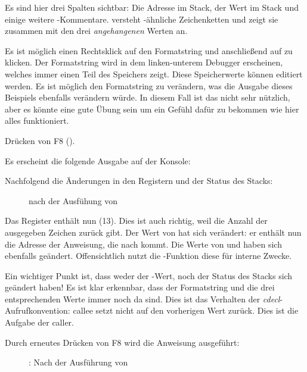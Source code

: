 Es sind hier drei Spalten sichtbar: Die Adresse im Stack, der Wert im Stack und einige weitere \olly-Kommentare.
\olly versteht \printf{}-ähnliche Zeichenketten und zeigt sie zusammen mit den drei \emph{angehangenen} Werten an.

Es ist möglich einen Rechtsklick auf den Formatstring und anschließend auf  zu klicken.
Der Formatstring wird in dem linken-unterem Debugger erscheinen, welches immer einen Teil des Speichers zeigt.
Diese Speicherwerte können editiert werden.
Es ist möglich den Formatstring zu verändern, was die Ausgabe dieses Beispiels ebenfalls verändern würde.
In diesem Fall ist das nicht sehr nützlich, aber es könnte eine gute Übung sein um ein Gefühl dafür zu
bekommen wie hier alles funktioniert.

\clearpage
Drücken von F8 (\stepover).

Es erscheint die folgende Ausgabe auf der Konsole:



Nachfolgend die Änderungen in den Registern und der Status des Stacks:

\begin{figure}[H]
\centering
{}
\caption{\olly nach der Ausfühung von \printf{}}
\label{fig:printf3_olly_3}
\end{figure}

Das Register \EAX enthält nun  (13).
Dies ist auch richtig, weil \printf die Anzahl der ausgegeben Zeichen zurück gibt.
Der Wert von \EIP hat sich verändert: er enthält nun die Adresse der Anweisung, die
nach  kommt.
Die Werte von \ECX und \EDX haben sich ebenfalls geändert.
Offensichtlich nutzt die \printf-Funktion diese für interne Zwecke.

Ein wichtiger Punkt ist, dass weder der \ESP-Wert, noch der Status des Stacks sich geändert haben!
Es ist klar erkennbar, dass der Formatstring und die drei entsprechenden Werte immer noch da sind.
Dies ist das Verhalten der \emph{cdecl}-Aufrufkonvention: \gls{callee} setzt \ESP nicht auf den vorherigen
Wert zurück. Dies ist die Aufgabe der \gls{caller}.

\clearpage
Durch erneutes Drücken von F8 wird die Anweisung  ausgeführt:

\begin{figure}[H]
\centering
{}
\caption{\olly: Nach der Ausführung von }
\label{fig:printf3_olly_4}
\end{figure}

